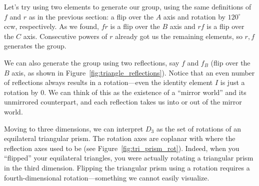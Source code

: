 \documentclass[../gatm.tex]{subfiles}
\begin{document}
Let's try using two elements to generate our group, using the same definitions of $f$ and $r$ as in the previous section: a flip over the $A$ axis and rotation by $120^{\circ}$ ccw, respectively. As we found, $fr$ is a flip over the $B$ axis and $rf$ is a flip over the $C$ axis. Consecutive powers of $r$ already got us the remaining elements, so ${r,f}$ generates the group.

We can also generate the group using two reflections, say $f$ and $f_B$ (flip over the $B$ axis, as shown in Figure~\ref{fig:triangle_reflections}). Notice that an even number of reflections always results in a rotation---even the identity element $I$ is just a rotation by $0$. We can think of this as the existence of a ``mirror world'' and its unmirrored counterpart, and each reflection takes us into or out of the mirror world.

Moving to three dimensions, we can interpret $D_3$ as the set of rotations of an equilateral triangular prism. The rotation axes are coplanar with where the reflection axes used to be (see Figure~\ref{fig:tri_prism_rot}). Indeed, when you ``flipped'' your equilateral triangles, you were actually rotating a triangular prism in the third dimension. Flipping the triangular prism using a rotation requires a fourth-dimensional rotation---something we cannot easily visualize.
\end{document}
